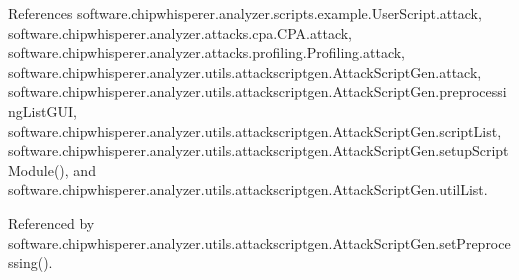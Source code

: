 References software.\+chipwhisperer.\+analyzer.\+scripts.\+example.\+User\+Script.\+attack, software.\+chipwhisperer.\+analyzer.\+attacks.\+cpa.\+C\+P\+A.\+attack, software.\+chipwhisperer.\+analyzer.\+attacks.\+profiling.\+Profiling.\+attack, software.\+chipwhisperer.\+analyzer.\+utils.\+attackscriptgen.\+Attack\+Script\+Gen.\+attack, software.\+chipwhisperer.\+analyzer.\+utils.\+attackscriptgen.\+Attack\+Script\+Gen.\+preprocessing\+List\+G\+U\+I, software.\+chipwhisperer.\+analyzer.\+utils.\+attackscriptgen.\+Attack\+Script\+Gen.\+script\+List, software.\+chipwhisperer.\+analyzer.\+utils.\+attackscriptgen.\+Attack\+Script\+Gen.\+setup\+Script\+Module(), and software.\+chipwhisperer.\+analyzer.\+utils.\+attackscriptgen.\+Attack\+Script\+Gen.\+util\+List.



Referenced by software.\+chipwhisperer.\+analyzer.\+utils.\+attackscriptgen.\+Attack\+Script\+Gen.\+set\+Preprocessing().


